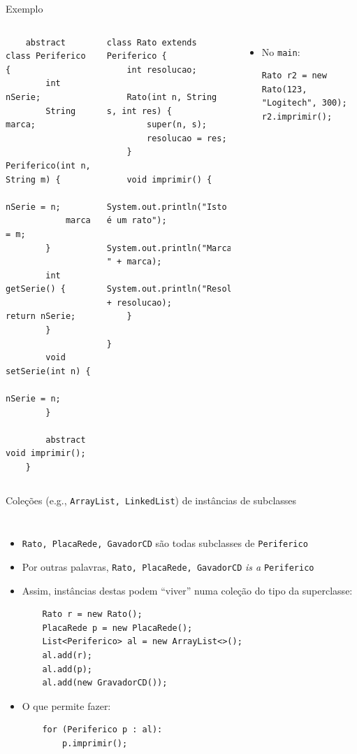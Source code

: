 \documentclass[portuguese, aspectratio=169, xcolor=table]{beamer}
\begin{document}
\begin{frame}[fragile]{Exemplo}
\begin{columns}  
\scriptsize
\begin{verbatim}
    abstract class Periferico {
        int nSerie;
        String marca;
        
        Periferico(int n, String m) {
            nSerie = n;
            marca = m;
        }
        
        int getSerie() {
            return nSerie;
        }
        
        void setSerie(int n) {
            nSerie = n;
        }
    
        abstract void imprimir();
    }
\end{verbatim}
\scriptsize
\begin{verbatim}   
class Rato extends Periferico {
    int resolucao;
    
    Rato(int n, String s, int res) {
        super(n, s);
        resolucao = res;
    }
    
    void imprimir() {
        System.out.println("Isto é um rato");
        System.out.println("Marca: " + marca);
        System.out.println("Resolução:" + resolucao);
    }
        
}
\end{verbatim}
\begin{itemize}
\item No \texttt{main}:
\begin{verbatim}
Rato r2 = new Rato(123, "Logitech", 300);
r2.imprimir();
\end{verbatim}
\end{itemize}
\end{columns}
\end{frame}


\begin{frame}[fragile]{Coleções (e.g., \texttt{ArrayList, LinkedList}) de instâncias de subclasses}
\begin{columns}
\begin{itemize}
    \item \texttt{Rato, PlacaRede, GavadorCD} são todas subclasses de \texttt{Periferico}
    \item Por outras palavras, \texttt{Rato, PlacaRede, GavadorCD} \textit{is a} \texttt{Periferico}
    \item Assim, instâncias destas podem ``viver'' numa coleção do tipo da superclasse:
\begin{verbatim}
    Rato r = new Rato();
    PlacaRede p = new PlacaRede();
    List<Periferico> al = new ArrayList<>();
    al.add(r);
    al.add(p);
    al.add(new GravadorCD());
\end{verbatim}
\item O que permite fazer:
\begin{verbatim}
    for (Periferico p : al):
        p.imprimir();
\end{verbatim}
\end{itemize}
\end{columns}
\end{frame}
\end{document}
